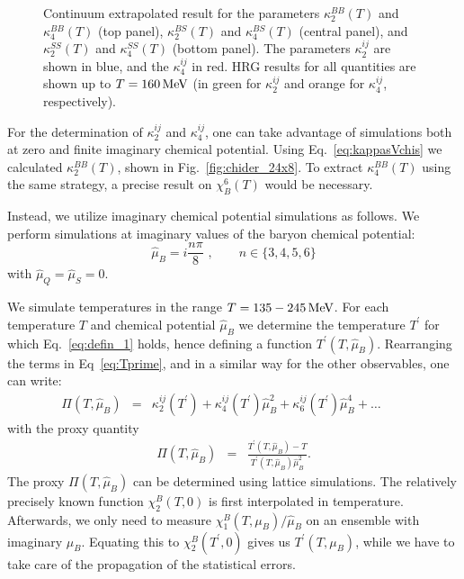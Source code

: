 \documentclass[aps,prd,twocolumn,superscriptaddress]{revtex4-2}
\newcommand \hmu {\hat{\mu}}
\newcommand{\MeV}{\, {\rm MeV}}
\begin{document}
\begin{figure}[!]
\caption{Continuum extrapolated result for the parameters $\kappa_2^{BB} (T)$
and $\kappa_4^{BB} (T)$ (top panel), $\kappa_2^{BS} (T)$ and $\kappa_4^{BS}
(T)$ (central panel), and $\kappa_2^{SS} (T)$ and $\kappa_4^{SS} (T)$ (bottom
panel). The parameters $\kappa_2^{ij}$ are shown in blue, and the
$\kappa_4^{ij}$ in red.  HRG results for all quantities are shown up to
$T=160\MeV$ (in green for $\kappa_2^{ij}$ and orange for $\kappa_4^{ij}$,
respectively).} 
\label{fig:final_kN}
\end{figure}

For the determination of $\kappa_2^{ij}$ and $\kappa_4^{ij}$, 
one can take advantage of simulations both at zero and 
finite imaginary chemical potential. Using 
Eq.~\eqref{eq:kappasVchis} we calculated $\kappa_2^{BB}(T)$, shown
in Fig.~\ref{fig:chider_24x8}. To extract $\kappa_4^{BB}(T)$ using the same strategy,
a precise result on $\chi^6_B(T)$ would be necessary.

Instead, we utilize imaginary chemical potential simulations as 
follows. We perform simulations at imaginary values of 
the baryon chemical potential:
\begin{equation}
\hmu_B = i \frac{n\pi}{8} \, \, , \qquad n \in \{3,4,5,6\}
\end{equation}
with $\hmu_Q = \hmu_S = 0$.

We simulate temperatures in the range 
$T = 135 - 245 \MeV$. For each temperature $T$ and 
chemical potential $\hmu_B$ we determine the 
temperature $T^\prime$ for which Eq.~\eqref{eq:defin_1}
holds, hence defining a function $T^\prime (T,\hmu_B)$. 
Rearranging the terms in Eq~\eqref{eq:Tprime}, and in a similar way for the other observables, one can write:
\begin{eqnarray}
\Pi(T,\hmu_B)&=&
\kappa_2^{ij}(T^\prime) + \kappa_4^{ij}(T^\prime) \hat{\mu}^2_B + \kappa_6^{ij}(T^\prime)\hat{\mu}^4_B +\dots \qquad 
\end{eqnarray}
with the proxy quantity
\begin{eqnarray}
\Pi(T,\hmu_B)&=&
\frac{T^\prime(T,\hmu_B) - T}{T^\prime(T,\hmu_B) \hat{\mu}_B^2}. 
\label{eq:proxy}
\end{eqnarray}
The proxy $\Pi(T,\hmu_B)$ can be determined
using lattice simulations. The relatively precisely
known function $\chi^B_2(T,0)$ is first
interpolated in temperature. Afterwards, we only need to measure 
$\chi_1^B(T,\mu_B)/\hmu_B$
on an ensemble with imaginary $\mu_B$.
Equating this to $\chi^B_2(T^\prime,0)$ gives us 
$T^\prime(T,\mu_B)$, while we have to take care of the propagation
of the statistical errors.
\end{document}
